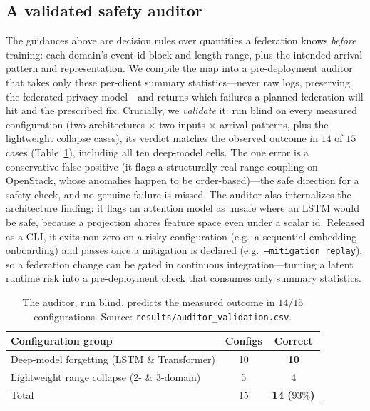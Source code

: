\documentclass[conference]{IEEEtran}
\begin{document}
\subsection{A validated safety auditor}
The guidances above are decision rules over quantities a federation knows \emph{before} training: each
domain's event-id block and length range, plus the intended arrival pattern and representation. We
compile the map into a pre-deployment auditor that takes only these per-client summary statistics---never
raw logs, preserving the federated privacy model---and returns which failures a planned federation will
hit and the prescribed fix. Crucially, we \emph{validate} it: run blind on every measured configuration
(two architectures $\times$ two inputs $\times$ arrival patterns, plus the lightweight collapse cases),
its verdict matches the observed outcome in $14$ of $15$ cases (Table~\ref{tab:audit}), including all
ten deep-model cells. The one error is a conservative false positive (it flags a structurally-real range coupling on
OpenStack, whose anomalies happen to be order-based)---the safe direction for a safety check, and no
genuine failure is missed. The auditor also internalizes the architecture finding: it flags an
attention model as unsafe where an LSTM would be safe, because a projection shares feature space even
under a scalar id. Released as a CLI, it exits non-zero on a risky configuration (e.g.\ a sequential
embedding onboarding) and passes once a mitigation is declared (e.g.\ \texttt{--mitigation replay}),
so a federation change can be gated in continuous integration---turning a latent runtime risk into a
pre-deployment check that consumes only summary statistics.

\begin{table}[t]
\caption{The auditor, run blind, predicts the measured outcome in $14/15$ configurations.
Source: \texttt{results/auditor\_validation.csv}.}
\label{tab:audit}
\centering\small
\begin{tabular}{@{}lcc@{}}
\toprule
Configuration group & Configs & Correct \\
\midrule
Deep-model forgetting (LSTM \& Transformer) & 10 & \textbf{10} \\
Lightweight range collapse (2- \& 3-domain)  & 5  & 4 \\
\midrule
Total & 15 & \textbf{14 ($93\%$)} \\
\bottomrule
\end{tabular}
\end{table}
\end{document}
